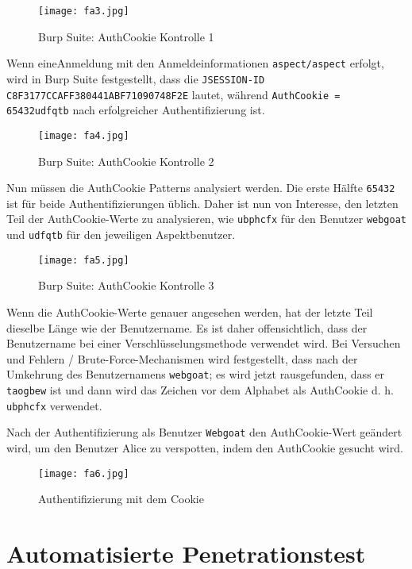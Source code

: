\begin{figure}[h]
	\centering
	\texttt{[image: fa3.jpg]}
	\caption{Burp Suite: AuthCookie Kontrolle 1}
\end{figure}

Wenn eineAnmeldung mit den Anmeldeinformationen \texttt{aspect/aspect} erfolgt, wird in Burp Suite festgestellt, dass die \texttt{JSESSION-ID C8F3177CCAFF380441ABF71090748F2E} lautet, während \texttt{AuthCookie = 65432udfqtb} nach erfolgreicher Authentifizierung ist.

\newpage

\begin{figure}[h]
	\centering
	\texttt{[image: fa4.jpg]}
	\caption{Burp Suite: AuthCookie Kontrolle 2}
\end{figure}

Nun müssen die AuthCookie Patterns analysiert werden. Die erste Hälfte \texttt{65432} ist für beide Authentifizierungen üblich. Daher ist nun von Interesse, den letzten Teil der AuthCookie-Werte zu analysieren, wie \texttt{ubphcfx} für den Benutzer \texttt{webgoat} und \texttt{udfqtb} für den jeweiligen Aspektbenutzer.\\

\begin{figure}[h]
	\centering
	\texttt{[image: fa5.jpg]}
	\caption{Burp Suite: AuthCookie Kontrolle 3}
\end{figure}

Wenn die AuthCookie-Werte genauer angesehen werden, hat der letzte Teil dieselbe Länge wie der Benutzername. Es ist daher offensichtlich, dass der Benutzername bei einer Verschlüsselungsmethode verwendet wird. Bei Versuchen und Fehlern / Brute-Force-Mechanismen wird festgestellt, dass nach der Umkehrung des Benutzernamens \texttt{webgoat}; es wird jetzt rausgefunden, dass er \texttt{taogbew} ist und dann wird das Zeichen vor dem Alphabet als AuthCookie d. h. \texttt{ubphcfx} verwendet.

\newpage

Nach der Authentifizierung als Benutzer \texttt{Webgoat} den AuthCookie-Wert geändert wird, um den Benutzer Alice zu verspotten, indem den AuthCookie gesucht wird.

\begin{figure}[h]
	\centering
	\texttt{[image: fa6.jpg]}
	\caption{Authentifizierung mit dem Cookie}
\end{figure}

\section{Automatisierte Penetrationstest}

